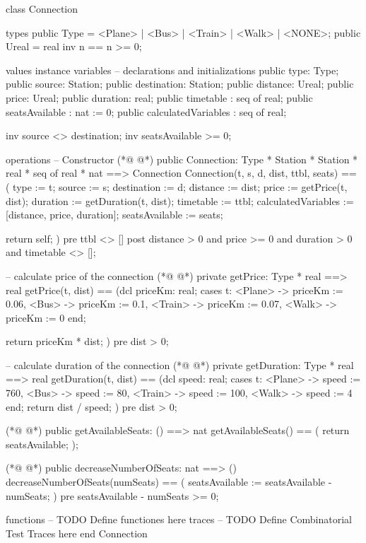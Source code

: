 \begin{vdmpp}[breaklines=true]
class Connection

types
 public Type = <Plane> | <Bus> | <Train> | <Walk> | <NONE>;
 public Ureal = real
        inv n == n >= 0;

values
instance variables
 -- declarations and initializations
 public type: Type;
 public source: Station;
 public destination: Station;
 public distance: Ureal;
 public price: Ureal;
 public duration: real;
 public timetable : seq of real;
 public seatsAvailable : nat := 0;
 public calculatedVariables : seq of real;
 
 inv source <> destination;
 inv seatsAvailable >= 0;
 
operations
 -- Constructor
(*@
\label{Connection:26}
@*)
 public Connection: Type * Station * Station * real * seq of real * nat ==> Connection
 Connection(t, s, d, dist, ttbl, seats) ==
 (
  type := t;
  source := s;
  destination := d;
  distance := dist;
  price := getPrice(t, dist);
  duration := getDuration(t, dist);
  timetable := ttbl;
  calculatedVariables := [distance, price, duration];
  seatsAvailable := seats;
  
  return self;
 )
 pre ttbl <> []
 post distance > 0 and price >= 0 and duration > 0 and timetable <> [];
 
 -- calculate price of the connection
(*@
\label{getPrice:45}
@*)
 private getPrice: Type * real ==> real
 getPrice(t, dist) ==
 (dcl priceKm: real;
   cases t:
    <Plane> -> priceKm := 0.06,
    <Bus> -> priceKm := 0.1,
    <Train> -> priceKm := 0.07,
    <Walk> -> priceKm := 0
   end;
   
   return priceKm * dist;
 )
 pre dist > 0;
 
 -- calculate duration of the connection
(*@
\label{getDuration:60}
@*)
 private getDuration: Type * real ==> real
 getDuration(t, dist) ==
 (dcl speed: real;
  cases t:
    <Plane> -> speed := 760,
    <Bus> -> speed := 80, 
    <Train> -> speed := 100,
    <Walk> -> speed := 4
   end;
   return dist / speed;
 )
 pre dist > 0;
 
(*@
\label{getAvailableSeats:73}
@*)
 public getAvailableSeats: () ==> nat
 getAvailableSeats() ==
 (
  return seatsAvailable;
 );
 
(*@
\label{decreaseNumberOfSeats:79}
@*)
 public decreaseNumberOfSeats: nat ==> ()
 decreaseNumberOfSeats(numSeats) ==
 (
  seatsAvailable := seatsAvailable - numSeats;
 )
 pre seatsAvailable - numSeats >= 0;
 
  
functions
-- TODO Define functiones here
traces
-- TODO Define Combinatorial Test Traces here
end Connection
\end{vdmpp}
